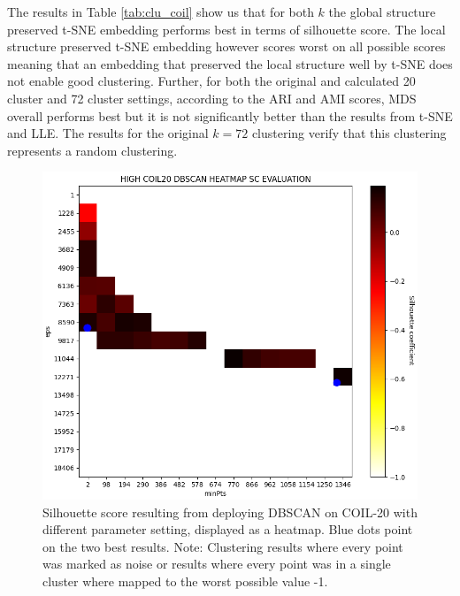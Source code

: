 The results in Table \ref{tab:clu_coil} show us that for both $k$ the global structure preserved t-SNE embedding performs best in terms of silhouette score. The local structure preserved t-SNE embedding however scores worst on all possible scores meaning that an embedding that preserved the local structure well by t-SNE does not enable good clustering. Further, for both the original and calculated 20 cluster and 72 cluster settings, according to the ARI and AMI scores, MDS overall performs best but it is not significantly better than the results from t-SNE and LLE. The results for the original $k=72$ clustering verify that this clustering represents a random clustering.

\begin{figure}[!]
	\centering
	\includegraphics[width=0.85\columnwidth]{images/SC_DBSCAN_COIL20_high.png}
	\caption[DBSCAN on COIL-20]{Silhouette score resulting from deploying DBSCAN on COIL-20 with different parameter setting, displayed as a heatmap. Blue dots point on the two best results. Note: Clustering results where every point was marked as noise or results where every point was in a single cluster where mapped to the worst possible value -1.}
    \label{fig:SC_DBSCAN_COIL20_high}
\end{figure}

